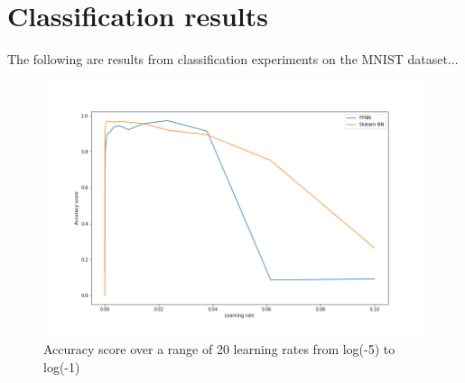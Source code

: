 \documentclass[reprint,english,notitlepage]{revtex4-2}  %
\begin{document}
\section{Classification results}
\begin{text}
	
	The following are results from classification experiments on the MNIST dataset...
\end{text}
 

\begin{figure}[!htb]
	\includegraphics[trim=75 0 0 0, scale=0.2]{Partd-2}
	\caption{Accuracy score over a range of 20 learning rates from log(-5) to log(-1)}\label{figure}
	
\end{figure}
\end{document}
